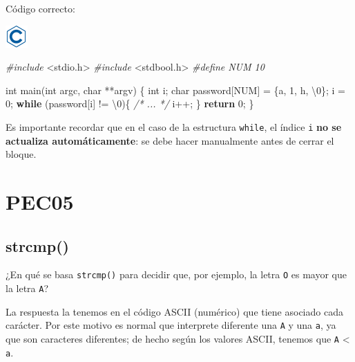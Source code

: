 \documentclass[
]{book}
\newenvironment{Shaded}{\begin{snugshade}}{\end{snugshade}}
\newcommand{\CharTok}[1]{\textcolor[rgb]{0.31,0.60,0.02}{#1}}
\newcommand{\CommentTok}[1]{\textcolor[rgb]{0.56,0.35,0.01}{\textit{#1}}}
\newcommand{\ControlFlowTok}[1]{\textcolor[rgb]{0.13,0.29,0.53}{\textbf{#1}}}
\newcommand{\DataTypeTok}[1]{\textcolor[rgb]{0.13,0.29,0.53}{#1}}
\newcommand{\DecValTok}[1]{\textcolor[rgb]{0.00,0.00,0.81}{#1}}
\newcommand{\ImportTok}[1]{#1}
\newcommand{\NormalTok}[1]{#1}
\newcommand{\PreprocessorTok}[1]{\textcolor[rgb]{0.56,0.35,0.01}{\textit{#1}}}
\begin{document}
Código correcto:

\includegraphics{./img/c.png}

\begin{Shaded}
\begin{Highlighting}[]
\PreprocessorTok{\#include }\ImportTok{\textless{}stdio.h\textgreater{}}
\PreprocessorTok{\#include }\ImportTok{\textless{}stdbool.h\textgreater{}}
\PreprocessorTok{\#define NUM 10}

\DataTypeTok{int}\NormalTok{ main(}\DataTypeTok{int}\NormalTok{ argc, }\DataTypeTok{char}\NormalTok{ **argv) \{}
    \DataTypeTok{int}\NormalTok{ i;}
    \DataTypeTok{char}\NormalTok{ password[NUM] = \{}\CharTok{\textquotesingle{}a\textquotesingle{}}\NormalTok{, }\CharTok{\textquotesingle{}1\textquotesingle{}}\NormalTok{, }\CharTok{\textquotesingle{}h\textquotesingle{}}\NormalTok{, }\CharTok{\textquotesingle{}\textbackslash{}0\textquotesingle{}}\NormalTok{\};}
\NormalTok{    i = }\DecValTok{0}\NormalTok{;}
    \ControlFlowTok{while}\NormalTok{ (password[i] != }\CharTok{\textquotesingle{}\textbackslash{}0\textquotesingle{}}\NormalTok{)\{}
        \CommentTok{/* ... */}
\NormalTok{    i++;}
\NormalTok{    \}}
    \ControlFlowTok{return} \DecValTok{0}\NormalTok{;}
\NormalTok{\}}
\end{Highlighting}
\end{Shaded}

Es importante recordar que en el caso de la estructura \texttt{while}, el índice \texttt{i} \textbf{no se actualiza automáticamente}: se debe hacer manualmente antes de cerrar el bloque.

\hypertarget{pec05}{%
\chapter{PEC05}\label{pec05}}

\hypertarget{strcmp}{%
\section{strcmp()}\label{strcmp}}

¿En qué se basa \texttt{strcmp()} para decidir que, por ejemplo, la letra \texttt{\textquotesingle{}O\textquotesingle{}} es mayor que la letra \texttt{\textquotesingle{}A\textquotesingle{}}?

La respuesta la tenemos en el código ASCII (numérico) que tiene asociado cada carácter. Por este motivo es normal que interprete diferente una \texttt{\textquotesingle{}A\textquotesingle{}} y una \texttt{\textquotesingle{}a\textquotesingle{}}, ya que son caracteres diferentes; de hecho según los valores ASCII, tenemos que \texttt{\textquotesingle{}A\textquotesingle{}} \textless{} \texttt{\textquotesingle{}a\textquotesingle{}}.
\end{document}
